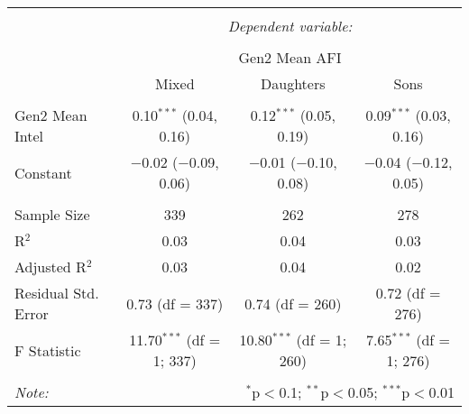 
\begingroup 
\small 
\begin{tabular}{@{\extracolsep{1pt}}lccc} 
\\[-1.8ex]\hline 
\hline \\[-1.8ex] 
 & \multicolumn{3}{c}{\textit{Dependent variable:}} \\ 
\cline{2-4} 
\\[-1.8ex] & \multicolumn{3}{c}{Gen2 Mean AFI} \\ 
 & Mixed & Daughters & Sons \\ 
\hline \\[-1.8ex] 
 Gen2 Mean Intel & 0.10$^{***}$ (0.04, 0.16) & 0.12$^{***}$ (0.05, 0.19) & 0.09$^{***}$ (0.03, 0.16) \\ 
  Constant & $-$0.02 ($-$0.09, 0.06) & $-$0.01 ($-$0.10, 0.08) & $-$0.04 ($-$0.12, 0.05) \\ 
 \hline \\[-1.8ex] 
Sample Size & 339 & 262 & 278 \\ 
R$^{2}$ & 0.03 & 0.04 & 0.03 \\ 
Adjusted R$^{2}$ & 0.03 & 0.04 & 0.02 \\ 
Residual Std. Error & 0.73 (df = 337) & 0.74 (df = 260) & 0.72 (df = 276) \\ 
F Statistic & 11.70$^{***}$ (df = 1; 337) & 10.80$^{***}$ (df = 1; 260) & 7.65$^{***}$ (df = 1; 276) \\ 
\hline 
\hline \\[-1.8ex] 
\textit{Note:}  & \multicolumn{3}{r}{$^{*}$p$<$0.1; $^{**}$p$<$0.05; $^{***}$p$<$0.01} \\ 
\end{tabular} 
\endgroup 
